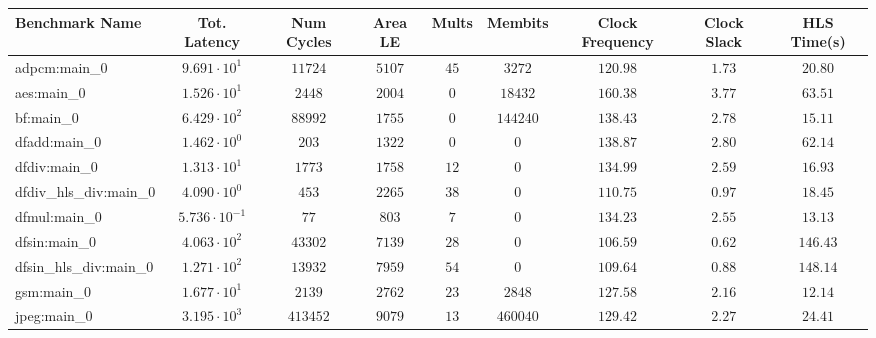 \begin{tabular}{|l|c|c|c|c|c|c|c|c|}
\hline
Benchmark Name          & Tot. Latency            & Num Cycles & Area LE   & Mults   & Membits    & Clock Frequency & Clock Slack & HLS Time(s) \\
\hline
adpcm:main\_0           & $ 9.691 \cdot 10^{1}  $ & $ 11724  $ & $ 5107  $ & $ 45  $ & $ 3272   $ & $ 120.98      $ & $ 1.73    $ & $ 20.80   $ \\
aes:main\_0             & $ 1.526 \cdot 10^{1}  $ & $ 2448   $ & $ 2004  $ & $ 0   $ & $ 18432  $ & $ 160.38      $ & $ 3.77    $ & $ 63.51   $ \\
bf:main\_0              & $ 6.429 \cdot 10^{2}  $ & $ 88992  $ & $ 1755  $ & $ 0   $ & $ 144240 $ & $ 138.43      $ & $ 2.78    $ & $ 15.11   $ \\
dfadd:main\_0           & $ 1.462 \cdot 10^{0}  $ & $ 203    $ & $ 1322  $ & $ 0   $ & $ 0      $ & $ 138.87      $ & $ 2.80    $ & $ 62.14   $ \\
dfdiv:main\_0           & $ 1.313 \cdot 10^{1}  $ & $ 1773   $ & $ 1758  $ & $ 12  $ & $ 0      $ & $ 134.99      $ & $ 2.59    $ & $ 16.93   $ \\
dfdiv\_hls\_div:main\_0 & $ 4.090 \cdot 10^{0}  $ & $ 453    $ & $ 2265  $ & $ 38  $ & $ 0      $ & $ 110.75      $ & $ 0.97    $ & $ 18.45   $ \\
dfmul:main\_0           & $ 5.736 \cdot 10^{-1} $ & $ 77     $ & $ 803   $ & $ 7   $ & $ 0      $ & $ 134.23      $ & $ 2.55    $ & $ 13.13   $ \\
dfsin:main\_0           & $ 4.063 \cdot 10^{2}  $ & $ 43302  $ & $ 7139  $ & $ 28  $ & $ 0      $ & $ 106.59      $ & $ 0.62    $ & $ 146.43  $ \\
dfsin\_hls\_div:main\_0 & $ 1.271 \cdot 10^{2}  $ & $ 13932  $ & $ 7959  $ & $ 54  $ & $ 0      $ & $ 109.64      $ & $ 0.88    $ & $ 148.14  $ \\
gsm:main\_0             & $ 1.677 \cdot 10^{1}  $ & $ 2139   $ & $ 2762  $ & $ 23  $ & $ 2848   $ & $ 127.58      $ & $ 2.16    $ & $ 12.14   $ \\
jpeg:main\_0            & $ 3.195 \cdot 10^{3}  $ & $ 413452 $ & $ 9079  $ & $ 13  $ & $ 460040 $ & $ 129.42      $ & $ 2.27    $ & $ 24.41   $ \\

\end{tabular}
